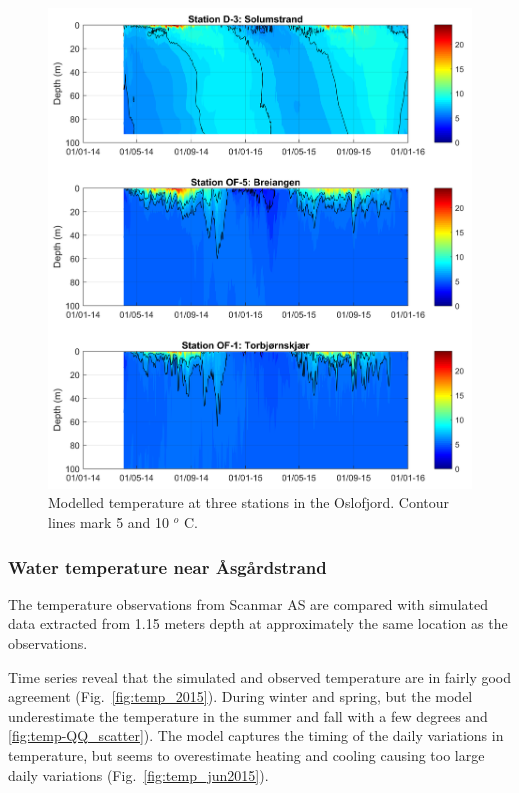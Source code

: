 \begin{figure}[tbh]
\centerline{
\includegraphics*[trim=0cm 0cm 0cm 0cm,clip=true,width=\textwidth]{Figurer/Temp_Mod_2014_2015}}
\caption{\small
Modelled temperature at three stations in the Oslofjord. Contour lines mark 5 and 10 $^o$ C.
}
\label{fig:Temp_Mod_2014_2015}
\end{figure}


\clearpage 

\subsubsection{Water temperature near \AA sg\aa rdstrand}

The temperature observations from Scanmar AS are compared with simulated data extracted from 1.15 meters depth at approximately the same location as the observations.

Time series reveal that the simulated and observed temperature are in fairly good agreement (Fig.~\ref{fig:temp_2015}). During winter and spring, but the model underestimate the temperature in the summer and fall with a few degrees  and \ref{fig:temp-QQ_scatter}). The model captures the timing of the daily variations in temperature, but seems to overestimate heating and cooling causing too large daily variations (Fig.~\ref{fig:temp_jun2015}). 

